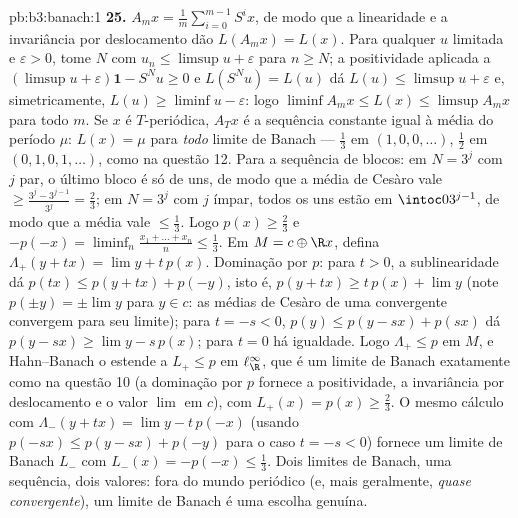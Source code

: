 \begin{solution}{pb:b3:banach:1}
\textbf{25.} $A_mx = \frac1m\sum_{i=0}^{m-1}S^ix$, de modo que
a linearidade e a invariância por deslocamento dão $L(A_mx) = L(x)$. Para qualquer
$u$ limitada e $\varepsilon > 0$, tome $N$ com $u_n \leq
\limsup u + \varepsilon$ para $n \geq N$; a positividade aplicada
a $(\limsup u + \varepsilon)\mathbf 1 - S^Nu \geq 0$ e
$L(S^Nu) = L(u)$ dá $L(u) \leq \limsup u + \varepsilon$
e, simetricamente, $L(u) \geq \liminf u - \varepsilon$: logo
$\liminf A_mx \leq L(x) \leq \limsup A_mx$ para todo $m$. Se
$x$ é $T$-periódica, $A_Tx$ é a sequência constante igual à
média do período $\mu$: $L(x) = \mu$ para \emph{todo} limite
de Banach --- $\frac13$ em $(1,0,0,\dots)$, $\frac12$ em
$(0,1,0,1,\dots)$, como na questão 12. Para a sequência de blocos:
em $N = 3^j$ com $j$ par, o último bloco é só de uns, de modo que a
média de Cesàro vale $\geq \frac{3^j - 3^{j-1}}{3^j} = \frac23$;
em $N = 3^j$ com $j$ ímpar, todos os uns estão em $\intoc0
{3^{j-1}}$, de modo que a média vale $\leq \frac13$. Logo $p(x) \geq
\frac23$ e $-p(-x) = \liminf_n\frac{x_1 + \dots + x_n}n
\leq \frac13$. Em $M = c \oplus \R x$, defina $\Lambda_+(y +
tx) = \lim y + t\,p(x)$. Dominação por $p$: para $t > 0$,
a sublinearidade dá $p(tx) \leq p(y + tx) + p(-y)$, isto é,
$p(y + tx) \geq t\,p(x) + \lim y$ (note $p(\pm y) = \pm\lim
y$ para $y \in c$: as médias de Cesàro de uma convergente
convergem para seu limite); para $t = -s < 0$, $p(y) \leq p(y -
sx) + p(sx)$ dá $p(y - sx) \geq \lim y - s\,p(x)$; para $t
= 0$ há igualdade. Logo $\Lambda_+ \leq p$ em $M$, e
Hahn--Banach o estende a $L_+ \leq p$ em $\ell^\infty_\R$,
que é um limite de Banach exatamente como na questão 10 (a dominação
por $p$ fornece a positividade, a invariância por deslocamento e o valor
$\lim$ em $c$), com $L_+(x) = p(x) \geq \frac23$. O mesmo
cálculo com $\Lambda_-(y + tx) = \lim y - t\,p(-x)$
(usando $p(-sx) \leq p(y - sx) + p(-y)$ para o caso $t = -s
< 0$) fornece um limite de Banach $L_-$ com $L_-(x) = -p(-x) \leq
\frac13$. Dois limites de Banach, uma sequência, dois valores:
fora do mundo periódico (e, mais geralmente, \emph{quase
convergente}), um limite de Banach é uma escolha genuína.
\end{solution}
